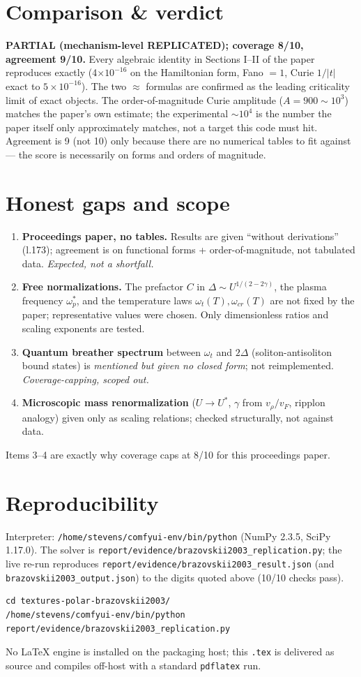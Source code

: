 \documentclass[11pt]{article}
\begin{document}
\section{Comparison \& verdict}
\textbf{PARTIAL (mechanism-level REPLICATED); coverage 8/10, agreement 9/10.}
Every algebraic identity in Sections I--II of the paper reproduces exactly
(4$\times10^{-16}$ on the Hamiltonian form, Fano $=1$, Curie $1/|t|$ exact to
$5\times10^{-16}$). The two $\approx$ formulas are confirmed as the leading
criticality limit of exact objects. The order-of-magnitude Curie amplitude
($A=900\sim10^3$) matches the paper's own estimate; the experimental $\sim10^4$
is the number the paper itself only approximately matches, not a target this code
must hit. Agreement is 9 (not 10) only because there are no numerical tables to
fit against --- the score is necessarily on forms and orders of magnitude.

\section{Honest gaps and scope}
\begin{enumerate}
\item \textbf{Proceedings paper, no tables.} Results are given ``without derivations''
      (l.173); agreement is on functional forms + order-of-magnitude, not tabulated data.
      \emph{Expected, not a shortfall.}
\item \textbf{Free normalizations.} The prefactor $C$ in $\Delta\sim U^{1/(2-2\gamma)}$,
      the plasma frequency $\omega_p^*$, and the temperature laws
      $\omega_t(T),\omega_{cr}(T)$ are not fixed by the paper; representative values
      were chosen. Only dimensionless ratios and scaling exponents are tested.
\item \textbf{Quantum breather spectrum} between $\omega_t$ and $2\Delta$
      (soliton-antisoliton bound states) is \emph{mentioned but given no closed form};
      not reimplemented. \emph{Coverage-capping, scoped out.}
\item \textbf{Microscopic mass renormalization} ($U\to U^*$, $\gamma$ from
      $v_\rho/v_F$, ripplon analogy) given only as scaling relations; checked
      structurally, not against data.
\end{enumerate}
Items 3--4 are exactly why coverage caps at 8/10 for this proceedings paper.

\section{Reproducibility}
Interpreter: \texttt{/home/stevens/comfyui-env/bin/python} (NumPy 2.3.5, SciPy 1.17.0).
The solver is \texttt{report/evidence/brazovskii2003\_replication.py}; the live re-run
reproduces \texttt{report/evidence/brazovskii2003\_result.json} (and
\texttt{brazovskii2003\_output.json}) to the digits quoted above (10/10 checks pass).
\begin{verbatim}
cd textures-polar-brazovskii2003/
/home/stevens/comfyui-env/bin/python report/evidence/brazovskii2003_replication.py
\end{verbatim}
No LaTeX engine is installed on the packaging host; this \texttt{.tex} is delivered as
source and compiles off-host with a standard \texttt{pdflatex} run.
\end{document}
